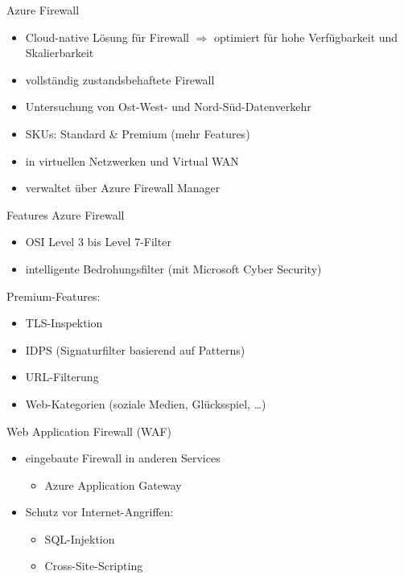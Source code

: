 \begin{flashcard}[]{Azure Firewall}
  \begin{itemize}
    \item Cloud-native Lösung für Firewall\newline
      $\Rightarrow$ optimiert für hohe Verfügbarkeit und Skalierbarkeit
    \item vollständig zustandsbehaftete Firewall
    \item Untersuchung von Ost-West- und Nord-Süd-Datenverkehr
    \item SKUs: Standard \& Premium (mehr Features)
    \item in virtuellen Netzwerken und Virtual WAN
    \item verwaltet über Azure Firewall Manager
  \end{itemize}
\end{flashcard}

\begin{flashcard}[]{Features Azure Firewall}
  \begin{itemize}
    \item OSI Level 3 bis Level 7-Filter
    \item intelligente Bedrohungsfilter (mit Microsoft Cyber Security)
  \end{itemize}
  Premium-Features:
  \begin{itemize}
    \item TLS-Inspektion
    \item IDPS (Signaturfilter basierend auf Patterns)
    \item URL-Filterung
    \item Web-Kategorien (soziale Medien, Glücksspiel, \ldots)
  \end{itemize}
\end{flashcard}

\begin{flashcard}[]{Web Application Firewall (WAF)}
  \begin{itemize}
    \item eingebaute Firewall in anderen Services
      \begin{itemize}
        \item Azure Application Gateway
      \end{itemize}
    \item Schutz vor Internet-Angriffen:
      \begin{itemize}
        \item SQL-Injektion
        \item Cross-Site-Scripting
      \end{itemize}
  \end{itemize}
\end{flashcard}

